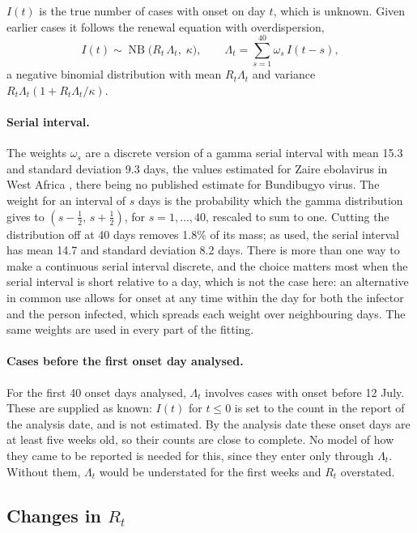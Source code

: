 \documentclass[11pt,a4paper]{article}
\newcommand{\nb}{\operatorname{NB}}
\begin{document}
$I(t)$ is the true number of cases with onset on day $t$, which is unknown.
Given earlier cases it follows the renewal equation with overdispersion,
\begin{equation}\label{eq:renewal}
I(t)\sim\nb\bigl(R_t\,\Lambda_t,\;\kappa\bigr),\qquad
\Lambda_t=\sum_{s=1}^{40}\omega_s\,I(t-s),
\end{equation}
a negative binomial distribution with mean $R_t\Lambda_t$ and variance
$R_t\Lambda_t(1+R_t\Lambda_t/\kappa)$.

\paragraph{Serial interval.} The weights $\omega_s$ are a discrete version of
a gamma serial interval with mean 15.3 and standard deviation 9.3 days, the
values estimated for Zaire ebolavirus in West Africa \cite{who2014}, there
being no published estimate for Bundibugyo virus. The weight for an interval
of $s$ days is the probability which the gamma distribution gives to
$(s-\tfrac12,\,s+\tfrac12)$, for $s=1,\dots,40$, rescaled to sum to one.
Cutting the distribution off at 40 days removes 1.8\% of its mass; as used,
the serial interval has mean 14.7 and standard deviation 8.2 days. There is
more than one way to make a continuous serial interval discrete, and the
choice matters most when the serial interval is short relative to a day,
which is not the case here: an alternative in common use \cite{cori2013}
allows for onset at any time within the day for both the infector and the
person infected, which spreads each weight over neighbouring days. The same
weights are used in every part of the fitting.

\paragraph{Cases before the first onset day analysed.} For the first 40 onset
days analysed, $\Lambda_t$ involves cases with onset before 12 July. These
are supplied as known: $I(t)$ for $t\le 0$ is set to the count in the report
of the analysis date, and is not estimated. By the analysis date these onset
days are at least five weeks old, so their counts are close to complete. No
model of how they came to be reported is needed for this, since they enter
only through $\Lambda_t$. Without them, $\Lambda_t$ would be understated for
the first weeks and $R_t$ overstated.

\subsection{Changes in $R_t$}\label{sec:Rt}
\end{document}
